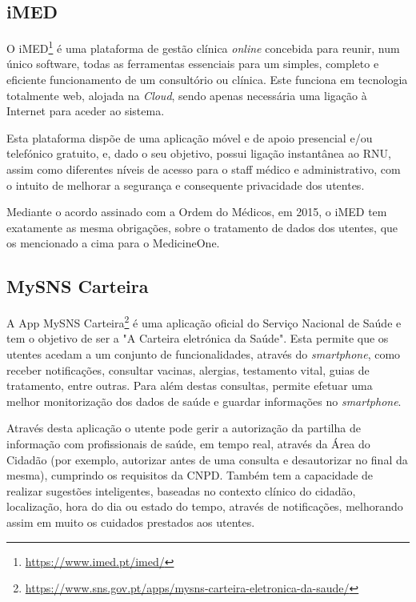 \documentclass[conference]{IEEEtran}
\begin{document}
\subsection{iMED}

O iMED\footnote{\url{https://www.imed.pt/imed/}} é uma plataforma de gestão clínica \textit{online} concebida para reunir, num único software, todas as ferramentas essenciais para um simples, completo e eficiente funcionamento de um consultório ou clínica. Este funciona em tecnologia totalmente web, alojada na \textit{Cloud}, sendo apenas necessária uma ligação à Internet para aceder ao sistema.

Esta plataforma dispõe de uma aplicação móvel e de apoio presencial e/ou telefónico gratuito, e, dado o seu objetivo, possui ligação instantânea ao RNU, assim como diferentes níveis de acesso para o staff médico e administrativo, com o intuito de melhorar a segurança e consequente privacidade dos utentes.

Mediante o acordo assinado com a Ordem do Médicos, em 2015, o iMED tem exatamente as mesma obrigações, sobre o tratamento de dados dos utentes, que os mencionado a cima para o MedicineOne.


\subsection{MySNS Carteira}

A App MySNS Carteira\footnote{\url{https://www.sns.gov.pt/apps/mysns-carteira-eletronica-da-saude/}} é uma aplicação oficial do Serviço Nacional de Saúde e tem o objetivo de ser a "A Carteira eletrónica da Saúde". Esta permite que os utentes acedam a um conjunto de funcionalidades, através do \textit{smartphone}, como receber notificações, consultar vacinas, alergias, testamento vital, guias de tratamento, entre outras. Para além destas consultas, permite efetuar uma melhor monitorização dos dados de saúde e guardar informações no \textit{smartphone}.

Através desta aplicação o utente pode gerir a autorização da partilha de informação com profissionais de saúde, em tempo real, através da Área do Cidadão (por exemplo, autorizar antes de uma consulta e desautorizar no final da mesma), cumprindo os requisitos da CNPD.
Também tem a capacidade de realizar sugestões inteligentes, baseadas no contexto clínico do cidadão, localização, hora do dia ou estado do tempo, através de notificações, melhorando assim em muito os cuidados prestados aos utentes.
\end{document}
